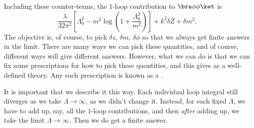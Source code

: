 \documentclass[a4paper]{article}
\begin{document}
Including these counter-terms, the $1$-loop contribution to $\bra \phi \phi\ket$ is
\[
  \frac{\lambda}{32 \pi^2} \left[\Lambda_0^2 - m^2 \log \left(1 + \frac{\Lambda_0^2}{m^2}\right)\right] + k^2 \delta Z + \delta m^2.
\]
The objective is, of course, to pick $\delta z$, $\delta m$, $\delta \phi$ so that we always get finite answers in the limit. There are many ways we can pick these quantities, and of course, different ways will give different answers. However, what we can do is that we can fix some prescriptions for how to pick these quantities, and this gives as a well-defined theory. Any such prescription is known as a .

It is important that we describe it this way. Each individual loop integral still diverges as we take $\Lambda \to \infty$, as we didn't change it. Instead, for each fixed $\Lambda$, we have to add up, say, all the $1$-loop contributions, and then \emph{after} adding up, we take the limit $\Lambda \to \infty$. Then we do get a finite answer.
\end{document}
